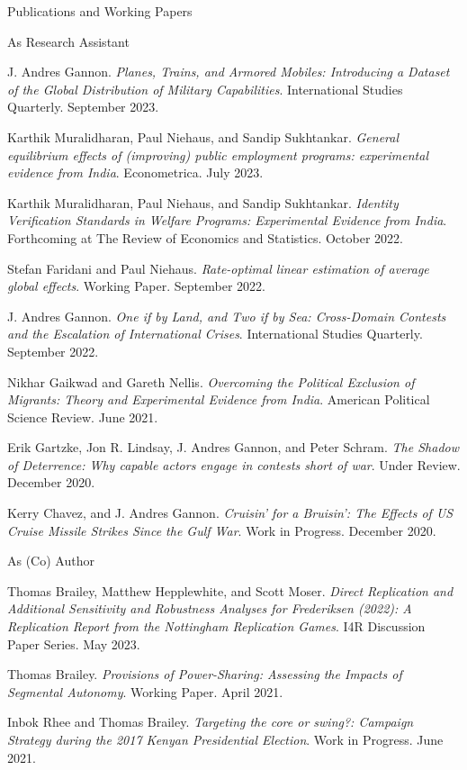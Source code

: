 \documentclass[10pt]{resume} %
\begin{document}
	\begin{rSection}{Publications and Working Papers}\itemsep -5pt
		
		\begin{rSubsection}{As Research Assistant}{}{}{}
		\item J. Andres Gannon. \textit{Planes, Trains, and Armored Mobiles: Introducing a Dataset of the Global Distribution of Military Capabilities}. International Studies Quarterly. September 2023.
		\item Karthik Muralidharan, Paul Niehaus, and Sandip Sukhtankar. \textit{General equilibrium effects of (improving) public employment programs: experimental evidence from India}. Econometrica. July 2023. 
		\item Karthik Muralidharan, Paul Niehaus, and Sandip Sukhtankar. \textit{Identity Verification Standards in Welfare Programs: Experimental Evidence from India}. Forthcoming at The Review of Economics and Statistics. October 2022. 
		\item Stefan Faridani and Paul Niehaus. \textit{Rate-optimal linear estimation of average global effects}. Working Paper. September 2022.
		\item J. Andres Gannon. \textit{One if by Land, and Two if by Sea: Cross-Domain Contests and the Escalation of International Crises}. International Studies Quarterly. September 2022.
		\item Nikhar Gaikwad and Gareth Nellis. \textit{Overcoming the Political Exclusion of Migrants: Theory and Experimental Evidence from India}. American Political Science Review. June 2021. 
		\item Erik Gartzke, Jon R. Lindsay, J. Andres Gannon, and Peter Schram. \textit{The Shadow of Deterrence: Why capable actors engage in contests short of war}. Under Review. December 2020. 
		\item Kerry Chavez, and J. Andres Gannon. \textit{Cruisin’ for a Bruisin’: The Effects of US Cruise Missile Strikes Since the Gulf War}. Work in Progress. December 2020.
		\end{rSubsection}
	
	\begin{rSubsection}{As (Co) Author}{}{}{}
		\item Thomas Brailey, Matthew Hepplewhite, and Scott Moser. \textit{Direct Replication and Additional Sensitivity and Robustness Analyses for Frederiksen (2022): A Replication Report from the Nottingham Replication Games}. I4R Discussion Paper Series. May 2023.
		\item Thomas Brailey. \textit{Provisions of Power-Sharing: Assessing the Impacts of Segmental Autonomy}. Working Paper. April 2021.
		\item Inbok Rhee and Thomas Brailey. \textit{Targeting the core or swing?: Campaign Strategy during the 2017 Kenyan Presidential Election}. Work in Progress. June 2021.
	\end{rSubsection}
	
	\end{rSection}
	
\end{document}
